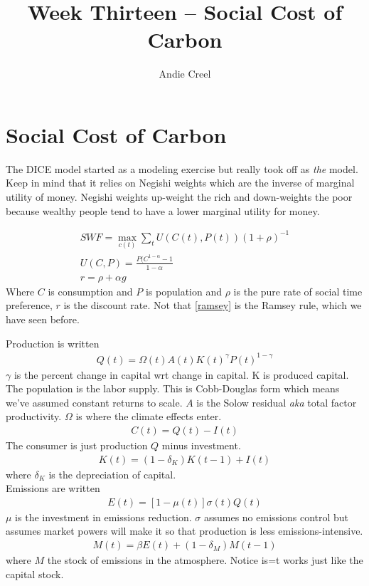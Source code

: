 \documentclass[12pt]{article}
\title{Week Thirteen -- Social Cost of Carbon}
\author{Andie Creel}
\begin{document}
\maketitle

\section{Social Cost of Carbon}
The DICE model started as a modeling exercise but really took off as \textit{the} model. Keep in mind that it relies on Negishi weights which are the inverse of marginal utility of money. Negishi weights up-weight the rich and down-weights the poor because wealthy people tend to have a lower marginal utility for money. 

\begin{align}
    SWF = \max_{c(t)} \sum_t U(C(t), P(t)) (1 + \rho)^{-1}\\
    U(C,P) = \frac{P(C^{1- \alpha} - 1}{1 - \alpha}\\
    r = \rho + \alpha g \label{ramsey}
\end{align}
Where $C$ is consumption and $P$ is population and $\rho$ is the pure rate of social time preference, $r$ is the discount rate. Not that \ref{ramsey} is the Ramsey rule, which we have seen before. 

Production is written 
\begin{align}
    Q(t) = \Omega(t)A(t)K(t)^\gamma P(t)^{1-\gamma}
\end{align}
$\gamma$ is the percent change in capital wrt change in capital. K is produced capital. The population is the labor supply. This is Cobb-Douglas form which means we've assumed constant returns to scale. $A$ is the Solow residual \textit{aka} total factor productivity. $\Omega$ is where the climate effects enter. 
\begin{align}
    C(t) = Q(t) - I(t)
\end{align}
The consumer is just production $Q$ minus investment.
\begin{align}
    K(t) = (1 - \delta_K) K(t-1) + I(t)
\end{align}
where $\delta_K$ is the depreciation of capital. \\

Emissions are written 
\begin{align}
    E(t) = [1 - \mu(t)] \sigma(t) Q(t)
\end{align}
$\mu$ is the investment in emissions reduction. $\sigma$ assumes no emissions control but assumes market powers will make it so that production is less emissions-intensive. 
\begin{align}
    M(t) = \beta E(t) + (1 - \delta_M) M(t-1)
\end{align}
where $M$ the stock of emissions in the atmosphere. Notice is=t works just like the capital stock. 
\end{document}
